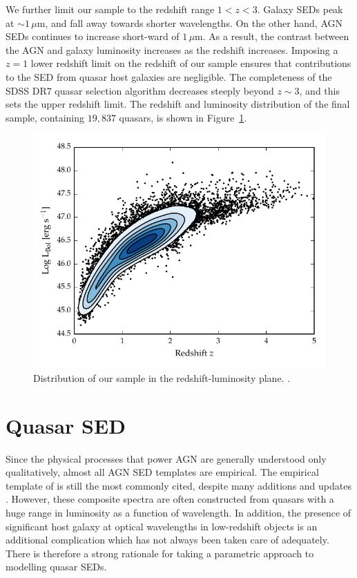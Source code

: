 We further limit our sample to the redshift range $1 < z < 3$. 
Galaxy SEDs peak at $\sim1$\,$\mu$m, and fall away towards shorter wavelengths. 
On the other hand, AGN SEDs continues to increase short-ward of $1$\,$\mu$m. 
As a result, the contrast between the AGN and galaxy luminosity increases as the redshift increases.
Imposing a $z=1$ lower redshift limit on the redshift of our sample ensures that contributions to the SED from quasar host galaxies are negligible.
The completeness of the SDSS DR7 quasar selection algorithm decreases steeply beyond $z\sim3$, and this sets the upper redshift limit. 
The redshift and luminosity distribution of the final sample, containing $19,837$ quasars, is shown in Figure~\ref{fig:lum_z}. 

\begin{figure}
  \centering
  \includegraphics[width=\textwidth]{figures/chapter05/lum_z.pdf}
  \caption[{Distribution of our sample in the redshift-luminosity plane.}]{Distribution of our sample in the redshift-luminosity plane. .}
  \label{fig:lum_z}
\end{figure}

\section{Quasar SED}

Since the physical processes that power AGN are generally understood only qualitatively, almost all AGN SED templates are empirical. 
The empirical template of \citet{elvis94} is still the most commonly cited, despite many additions and updates \citep[e.g.][]{polletta00, kuraszkiewicz03, risaliti04, richards06,  polletta07, lusso10, shang11, marchese12, trichas12}. 
However, these composite spectra are often constructed from quasars with a huge range in luminosity as a function of wavelength. 
In addition, the presence of significant host galaxy at optical wavelengths in low-redshift objects is an additional complication which has not always been taken care of adequately. 
There is therefore a strong rationale for taking a parametric approach to modelling quasar SEDs. 

